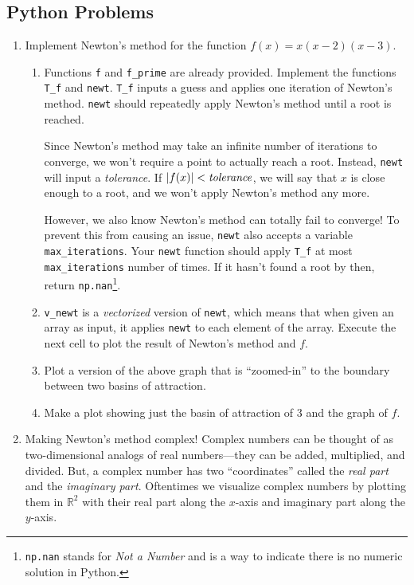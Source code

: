 \documentclass[letter]{article}
\newcommand{\R}{\mathbb{R}}
\begin{document}
	\subsection*{Python Problems}
	\begin{enumerate}
		\item Implement Newton's method for the function $f(x)=x(x-2)(x-3)$.
			\begin{enumerate}
				\item Functions \verb|f| and \verb|f_prime| are already provided. Implement the functions
					\verb|T_f| and \verb|newt|. \verb|T_f| inputs a guess and applies one iteration
					of Newton's method. \verb|newt| should repeatedly apply Newton's method until a root
					is reached.

					Since Newton's method may take an infinite number of iterations to converge, we 
					won't require a point to actually reach a root. Instead, \verb|newt| will input a 
					\emph{tolerance}. If $|f(x)|<\text{\emph{tolerance}}$, we will say that $x$ is 
					close enough to a root, and we won't apply Newton's method any more.

					However, we also know Newton's method can totally fail to converge! To prevent this
					from causing an issue,
					\verb|newt| also accepts a variable \verb|max_iterations|. Your \verb|newt| function
					should apply \verb|T_f| at most \verb|max_iterations| number of times. If it hasn't found
					a root by then, return \verb|np.nan|\footnote{ {\tt np.nan} stands for \emph{Not a Number}
					and is a way to indicate there is no numeric solution in Python.}.
				\item \verb|v_newt| is a \emph{vectorized} version of \verb|newt|, which means that when given an
					array as input, it applies \verb|newt| to each element of the array. Execute the next cell
					to plot the result of Newton's method and $f$.
				\item Plot a version of the above graph that is ``zoomed-in'' to the boundary between two basins of attraction.
				\item Make a plot showing just the basin of attraction of $3$ and the graph of $f$.
			\end{enumerate}
		\item Making Newton's method complex!
			Complex numbers can be thought of as two-dimensional analogs of real numbers---they can be
			added, multiplied, and divided. But, a complex number has two ``coordinates'' called the \emph{real part}
			and the \emph{imaginary part}. Oftentimes we visualize complex numbers by plotting them in $\R^2$
			with their real part along the $x$-axis and imaginary part along the $y$-axis.


\end{enumerate}
\end{document}
